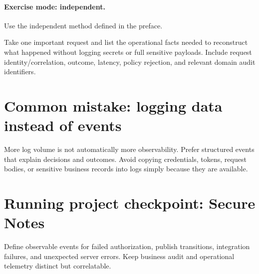 \paragraph{Exercise mode: independent.} Use the independent method defined in the preface.

Take one important request and list the operational facts needed to reconstruct what happened without logging secrets or full sensitive payloads. Include request identity/correlation, outcome, latency, policy rejection, and relevant domain audit identifiers.

\section{Common mistake: logging data instead of events}
More log volume is not automatically more observability. Prefer structured events that explain decisions and outcomes. Avoid copying credentials, tokens, request bodies, or sensitive business records into logs simply because they are available.

\section{Running project checkpoint: Secure Notes}
Define observable events for failed authorization, publish transitions, integration failures, and unexpected server errors. Keep business audit and operational telemetry distinct but correlatable.

